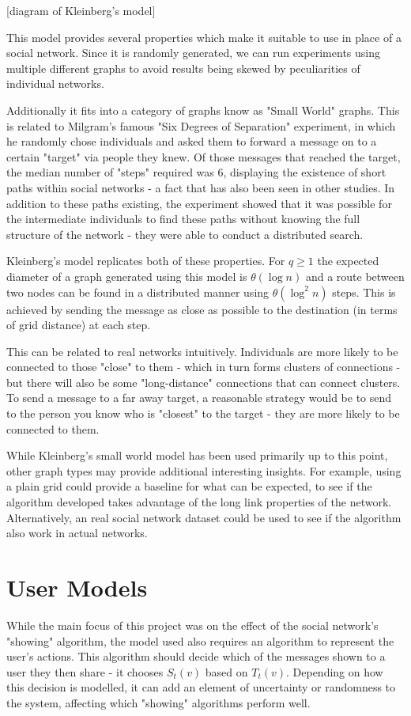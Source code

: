 \documentclass[bsc,frontabs,twoside,singlespacing,parskip,deptreport]{infthesis}     %
\begin{document}
[diagram of Kleinberg's model]

This model provides several properties which make it suitable to use in place of a social network. Since it is randomly generated, we can run experiments using multiple different graphs to avoid results being skewed by peculiarities of individual networks. 

Additionally it fits into a category of graphs know as "Small World" graphs. This is related to Milgram's famous "Six Degrees of Separation" experiment\cite{Milgram67}, in which he randomly chose individuals and asked them to forward a message on to a certain "target" via people they knew. Of those messages that reached the target, the median number of "steps" required was 6, displaying the existence of short paths within social networks - a fact that has also been seen in other studies\cite{MilgramBackup1,MilgramBackup2}. In addition to these paths existing, the experiment showed that it was possible for the intermediate individuals to find these paths without knowing the full structure of the network - they were able to conduct a distributed search. 

Kleinberg's model replicates both of these properties. For $q \ge 1$ the expected diameter of a graph generated using this model is $\theta (\log n)$ and a route between two nodes can be found in a distributed manner using $\theta (\log^{2}n)$ steps\cite{AnalyzingKleinberg}. This is achieved by sending the message as close as possible to the destination (in terms of grid distance) at each step.

This can be related to real networks intuitively. Individuals are more likely to be connected to those "close" to them - which in turn forms clusters of connections - but there will also be some "long-distance" connections that can connect clusters. To send a message to a far away target, a reasonable strategy would be to send to the person you know who is "closest" to the target - they are more likely to be connected to them.

While Kleinberg's small world model has been used primarily up to this point, other graph types may provide additional interesting insights. For example, using a plain grid could provide a baseline for what can be expected, to see if the algorithm developed takes advantage of the long link properties of the network. Alternatively, an real social network dataset could be used to see if the algorithm also work in actual networks.

\section{User Models}
While the main focus of this project was on the effect of the social network's "showing" algorithm, the model used also requires an algorithm to represent the user's actions. This algorithm should decide which of the messages shown to a user they then share - it chooses $S_{t}(v)$ based on $T_{t}(v)$. Depending on how this decision is modelled, it can add an element of uncertainty or randomness to the system, affecting which "showing" algorithms perform well.
\end{document}
